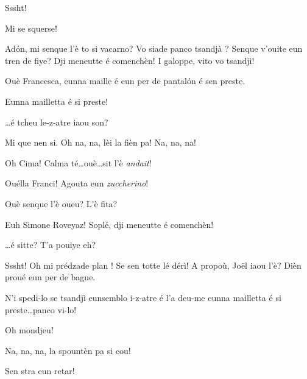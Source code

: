 \begin{drama}
\Pierrespeaks Sssht!

\Joelspeaks Mi se squerse!


\Francescaspeaks Ad\'on, mi senque l'è to si vacarno? Vo siade panco tsandjà \disperazione ? Senque v'ouite eun tren de fiye? Dji meneutte é comenchèn! I galoppe, vito vo tsandjì!

\Marcospeaks Ouè Francesca, eunna maille é eun per de pantal\'on é sen preste.

\Joelspeaks Eunna mailletta é si preste!


\Francescaspeaks \ldots é tcheu le-z-atre iaou son?

\Cimaspeaks Mi que nen si. Oh na, na, lèi la fièn pa! Na, na, na!

\Francescaspeaks Oh Cima! Calma té\ldots ouè\ldots sit l'è \textit{andait}! 


\Simonespeaks{} Ouélla Franci! Agouta eun \textit{zuccherino}!


\Cimaspeaks{} Ouè senque l'è oueu? L'è fita?

\Francescaspeaks Euh Simone Roveyaz! Soplé, dji meneutte é comenchèn!

\Simonespeaks{} \ldots é sitte? T'a pouiye eh?



\Joellespeaks Sssht! Oh mi prédzade plan 	\quei ! Se sen totte lé dérì!   A propoù, Jo\"{e}l iaou l'è? Dièn proué eun per de bague.

\Francescaspeaks N'i spedi-lo se tsandjì eunsemblo i-z-atre é l'a deu-me \og eun\-na mailletta é si preste\fg \ldots panco vi-lo!

\Joellespeaks Oh mondjeu!

\Cimaspeaks{} Na, na, na, la spountèn pa si cou!

\Francescaspeaks Sen stra eun retar!


\end{drama}
